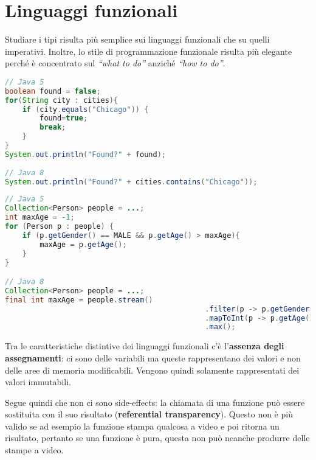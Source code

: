 \section{Linguaggi funzionali}

Studiare i tipi risulta più semplice sui linguaggi funzionali che su quelli imperativi.
Inoltre, lo stile di programmazione funzionale risulta più elegante perché è concentrato sul \textit{``what to do''} anziché \textit{``how to do''}.

\begin{lstlisting}[language=Java, caption=Confronto tra Java 5 e Java 8: nel secondo caso è subito chiaro l'intento del programmatore in oltre non vengono aggiunte variabili \textit{mutable}. Tuttavia l'esempio non usa le caratteristiche funzionali di Java8]
// Java 5
boolean found = false;
for(String city : cities){
	if (city.equals("Chicago")) {
		found=true;
		break;
	}
}
System.out.println("Found?" + found);
	
// Java 8
System.out.println("Found?" + cities.contains("Chicago"));
\end{lstlisting}

\begin{lstlisting}[language = Java, caption=Confronto tra Java 5 e Java 8: l'utlilizzo delle funzioni lambda rende il codice più conciso. Inoltre non vengono usate variabili mutabili e il codice è facilmente parallelizzabile.]
// Java 5
Collection<Person> people = ...;
int maxAge = -1;
for (Person p : people) {
	if (p.getGender() == MALE && p.getAge() > maxAge){
		maxAge = p.getAge();
	}
}

// Java 8
Collection<Person> people = ...;
final int maxAge = people.stream()
										      .filter(p -> p.getGender() == MALE)
										      .mapToInt(p -> p.getAge())
										      .max();
\end{lstlisting}

\noindent Tra le caratteristiche distintive dei linguaggi funzionali c'è l'\textbf{assenza degli assegnamenti}: ci sono delle variabili ma queste rappresentano dei valori e non delle aree di memoria modificabili. Vengono quindi solamente rappresentati dei valori immutabili.

Segue quindi che non ci sono side-effects: la chiamata di una funzione può essere sostituita con il suo risultato (\textbf{referential transparency}). Questo non è più valido se ad esempio la funzione stampa qualcosa a video e poi ritorna un risultato, pertanto se una funzione è pura, questa non può neanche produrre delle stampe a video.

